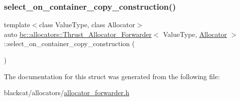 \mbox{\label{structbc_1_1allocators_1_1Thrust__Allocator__Forwarder_a442d5ec3e3edaebe880f32f9054f1f52}} 
\subsubsection{\texorpdfstring{select\+\_\+on\+\_\+container\+\_\+copy\+\_\+construction()}{select\_on\_container\_copy\_construction()}}
{\footnotesize\ttfamily template$<$class Value\+Type, class Allocator$>$ \\
auto \hyperlink{structbc_1_1allocators_1_1Thrust__Allocator__Forwarder}{bc\+::allocators\+::\+Thrust\+\_\+\+Allocator\+\_\+\+Forwarder}$<$ Value\+Type, \hyperlink{classbc_1_1allocators_1_1Allocator}{Allocator} $>$\+::select\+\_\+on\+\_\+container\+\_\+copy\+\_\+construction (\begin{DoxyParamCaption}{ }\end{DoxyParamCaption})\hspace{0.3cm}{\ttfamily [inline]}}



The documentation for this struct was generated from the following file\+:\begin{DoxyCompactItemize}
\item 
blackcat/allocators/\hyperlink{allocator__forwarder_8h}{allocator\+\_\+forwarder.\+h}\end{DoxyCompactItemize}
